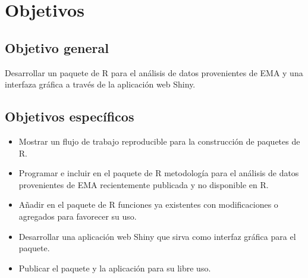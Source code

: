 \chapter{Objetivos}
\section{Objetivo general}
 
Desarrollar un paquete de R para el análisis de datos provenientes de EMA y una interfaza gráfica a través de la aplicación web Shiny.


\section{Objetivos específicos}
\begin{itemize}
\item Mostrar un flujo de trabajo reproducible para la construcción de paquetes de R.
\item Programar e incluir en el paquete de R metodología para el análisis de datos provenientes de EMA recientemente publicada y no disponible en R.
\item Añadir en el paquete de R funciones ya existentes con modificaciones o agregados para favorecer su uso.
\item Desarrollar una aplicación web Shiny que sirva como interfaz gráfica para el paquete.
\item Publicar el paquete y la aplicación para su libre uso.
\end{itemize}

